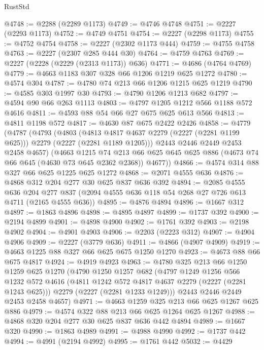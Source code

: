 \begin{lexlean}{RustStd}
\begin{coremodule}
@4748 := @2288 (@2289 @1173)
@4749 := @4746 @4748
@4751 := @2227 (@2293 @1173)
@4752 := @4749 @4751
@4754 := @2227 (@2298 @1173)
@4755 := @4752 @4754
@4758 := @2227 (@2302 @1173 @444)
@4759 := @4755 @4758
@4763 := @2227 (@2307 @285 @444 @30)
@4764 := @4759 @4763
@4769 := @2227 (@2228 (@2229 (@2313 @1173)) @636)
@4771 := @4686 (@4764 @4769)
@4779 := @4663 @1183 @307 @328 @66 @1206 @1219 @625 @1272
@4780 := @4574 @304
@4787 := @4780 @74 @213 @66 @1206 @1215 @625 @1219
@4790 := @4585 @303 @1997 @30
@4793 := @4790 @1206 @1213 @682
@4797 := @4594 @90 @66 @263 @1113
@4803 := @4797 @1205 @1212 @566 @1188 @572 @4616
@4811 := @4593 @88 @54 @66 @27 @675 @625 @613 @566
@4813 := @4811 @1198 @572
@4817 := @4630 @87 @675 @2422 @2426
@4858 := @4779
    (@4787
      (@4793
        (@4803
          (@4813 @4817 @4637 @2279 (@2227 (@2281 @1199 @625)))
          @2279
          (@2227 (@2281 @1189 @1205)))
        @2443
        @2446
        @2449
        @2453
        @2458
        @4657)
      (@4663
        @1215
        @74
        @213
        @66
        @625
        @645
        @625
        @886
        (@4673 @74 @66 @645 (@4630 @73 @645 @2362 @2368))
        @4677))
@4866 := @4574 @314 @88 @327 @66 @625 @1225 @625 @1272
@4868 := @2071 @4555 @636
@4876 := @4868 @312 @204 @277 @30 @625 @837 @636 @392
@4894 := @2085
    @4555
    @636
    @204
    @277
    @837
    (@2094 @4555 @636 @118 @54 @268 @27 @726 @613 @4711 (@2165 @4555 @636))
@4895 := @4876 @4894
@4896 := @1667 @312
@4897 := @1863 @4896
@4898 := @4895 @4897
@4899 := @1737 @392
@4900 := @2194 @4899
@4901 := @4898 @4900
@4902 := @1761 @392
@4903 := @2198 @4902
@4904 := @4901 @4903
@4906 := @2203 (@2223 @312)
@4907 := @4904 @4906
@4909 := @2227 (@3779 @636)
@4911 := @4866 (@4907 @4909)
@4919 := @4663 @1225 @88 @327 @66 @625 @675 @1250 @1270
@4923 := @4673 @88 @66 @675 @4817
@4924 := @4919 @4923
@4963 := @4780
    @325
    @213
    @66
    @1250
    @1259
    @625
    @1270
    (@4790
      @1250
      @1257
      @682
      (@4797
        @1249
        @1256
        @566
        @1232
        @572
        @4616
        (@4811 @1242 @572 @4817 @4637 @2279 (@2227 (@2281 @1243 @625)))
        @2279
        (@2227 (@2281 @1233 @1249)))
      @2443
      @2446
      @2449
      @2453
      @2458
      @4657)
@4971 := @4663 @1259 @325 @213 @66 @625 @1267 @625 @886
@4979 := @4574 @322 @88 @213 @66 @625 @1264 @625 @1267
@4988 := @4868 @320 @204 @277 @30 @625 @837 @636 @442 @4894
@4989 := @1667 @320
@4990 := @1863 @4989
@4991 := @4988 @4990
@4992 := @1737 @442
@4994 := @4991 (@2194 @4992)
@4995 := @1761 @442
@5032 := @4429

\end{coremodule}
\end{lexlean}
